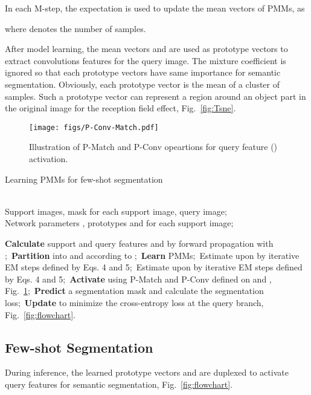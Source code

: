 \documentclass[runningheads]{llncs}
\begin{document}
In each M-step, the expectation is used to update the mean vectors of PMMs, as

where  denotes the number of samples. 

After model learning, the mean vectors   and   are used as prototype vectors to extract convolutions features for the query image. The mixture coefficient  is ignored so that each prototype vectors have same importance for semantic segmentation. Obviously, each prototype vector is the mean of a cluster of samples. Such a prototype vector can represent a region around an object part in the original image for the reception field effect, Fig.\ \ref{fig:Tsne}. 


\begin{figure}[t]
\centering
\texttt{[image: figs/P-Conv-Match.pdf]}
\caption{Illustration of P-Match and P-Conv opeartions for query feature () activation.}
\label{fig:segmentation}
\vspace{-0.2cm}
\end{figure}

\begin{algorithm}[t]
\label{alg:onlineEM}
\caption{Learning PMMs for few-shot segmentation}
\renewcommand{\algorithmicrequire}{\textbf{Input:}}  
\renewcommand{\algorithmicensure}{\textbf{Output:}}  
\begin{algorithmic}
\REQUIRE ~~\\ Support images, mask  for each support image, query image;
\ENSURE ~~\\ Network parameters , prototypes  and  for each support image;

\STATE \textbf{Calculate} support and query features  and  by forward propagation with ;\
\STATE \textbf{Partition}  into  and  according to ;\
\STATE \textbf{Learn} PMMs;\
\STATE\quad\quad Estimate  upon  by iterative EM steps defined by  Eqs. 4 and 5;\
\STATE\quad\quad Estimate  upon  by iterative EM steps defined by  Eqs. 4 and 5;\
\STATE \textbf{Activate}  using P-Match and P-Conv defined on  and , Fig.\ \ref{fig:segmentation};\
\STATE \textbf{Predict} a segmentation mask and calculate the segmentation loss;\
\STATE \textbf{Update}  to minimize the cross-entropy loss at the query branch, Fig.\ \ref{fig:flowchart}.\
\ENDFOR
\end{algorithmic}
\end{algorithm}

\subsection{Few-shot Segmentation}
During inference, the learned prototype vectors   and  are duplexed to activate query features for semantic segmentation, Fig.\ \ref{fig:flowchart}. 
\end{document}
